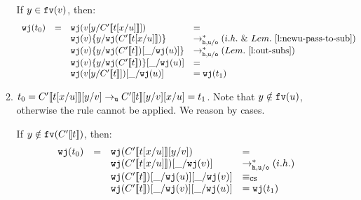 \documentclass{LMCS}
\renewcommand{\>}{\rightarrow}
\newcommand{\Rew}[1]{\rightarrow_{#1}}
\newcommand{\Rewnmod}[2]{\rightarrow^*_{#1/#2}}
\newcommand{\isubs}[1]{ \{ #1  \} }
\newcommand{\dis}{{\tt j}}
\newcommand{\fv}[1]{{\tt fv}(#1)}
\newcommand{\proj}{\wfc}
\newcommand{\Gc}{{\tt w}}
\newcommand{\CS}{{\tt CS}}
\newcommand{\ih}{i.h.}
\newcommand{\wfc}{\Gc\dis}
\newcommand{\unboxed}{{\tt u}}
\newcommand{\ignore}[1]{}
\newcommand{\osym}{{\tt o}}
\newcommand{\New}{{\tt h}}
\newcommand{\ctx}[2]{#1 [ \! [#2] \! ]}
\newcommand{\void}{\_}
\begin{document}
\begin{enumerate}[$\bullet$]
\begin{enumerate}[$-$]
If $y \in \fv{v}$, then:
        \[ \begin{array}{lllll} 
        \proj(t_0)&=&\proj(v[y/\ctx{C'}{t[x/u]}]) &=\\
	&&\proj(v)\isubs{y/\proj(\ctx{C'}{t[x/u]})}	&\Rewnmod{\New, \unboxed}{\osym} (\ih\ \&\ Lem.~\ref{l:newu-pass-to-sub}) &\\
&&\proj(v)\isubs{y/\proj(\ctx{C'}{t})[\void/\proj(u)]} &\Rewnmod{\New, \unboxed}{\osym}(Lem.~\ref{l:out-subs})\\
&&\proj(v)\isubs{y/\proj(\ctx{C'}{t})}[\void/\proj(u)] &=\\
&&\proj(v[y/\ctx{C'}{t}])[\void/\proj(u)] &=\proj(t_1)
        \end{array} \] 
        

\ignore{        
Now suppose $x \in \fv{\ctx{C'}{t}}$.  Again we reason by cases. 

If $y \notin \fv{v}$, then:
        \[ \begin{array}{llll} 
        \proj(t_0)&=&\proj(v[y/\ctx{C'}{t[x/u]}]) &=\\
	&&\proj(v)[y/\proj(\ctx{C'}{t[x/u]})]	&\Rewnmod{\New, \unboxed}{\osym} (\ih)\\
        &&\proj(v)[y/\proj(\ctx{C'}{t})\isubs{x/\proj(u)}] & =\\
        &&\proj(v)[y/\proj(\ctx{C'}{t})]\isubs{x/\proj(u)} &= \proj(t_1)
        \end{array} \] 

If $y \in \fv{v}$, then:
        \[ \begin{array}{lllll} 
        \proj(t_0)&=&\proj(v[y/\ctx{C'}{t[x/u]}]) &=\\
	&&\proj(v)\isubs{y/\proj(\ctx{C'}{t[x/u]})}	&\Rewnmod{\New, \unboxed}{\osym} (\ih\ \&\  Lem.~\ref{l:newu-pass-to-sub}) \\
&&\proj(v)\isubs{y/\proj(\ctx{C'}{t})\isubs{x/\proj(u)}} &=\\
&&\proj(v)\isubs{y/\proj(\ctx{C'}{t})}\isubs{x/\proj(u)} &=\\
&&\proj(v[y/\ctx{C'}{t}])\isubs{x/\proj(u)} &=\proj(t_1)
        \end{array} \] 
}
\item  $t_0 = \ctx{C'}{t[x/u]}[y/v]\Rew{\unboxed}
        \ctx{C'}{t}[y/v][x/u]= t_1$.  Note that $y\notin \fv{u}$, otherwise the rule cannot be applied.         We reason by cases. 


        If $y \notin \fv{\ctx{C'}{t}}$, then:
        \[ \begin{array}{lllll} 
           \proj(t_0)&=&\proj(\ctx{C'}{t[x/u]}[y/v]) &= \\
&&\proj(\ctx{C'}{t[x/u]})[\void/\proj(v)]&\Rewnmod{\New, \unboxed}{\osym} (\ih)\\
&&\proj(\ctx{C'}{t})[\void/\proj(u)][\void/\proj(v)]&  \equiv_{\CS} \\
&&\proj(\ctx{C'}{t})[\void/\proj(v)][\void/\proj(u)]&  = \proj(t_1)  
           \end{array} \] 


\end{enumerate}
\end{enumerate}
\end{document}
